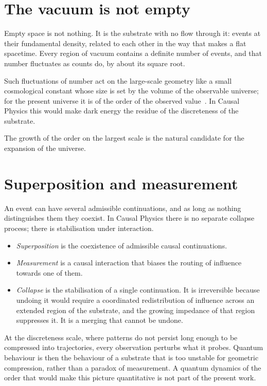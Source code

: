 \section{The vacuum is not empty}\label{sec:onto-vacuum}

Empty space is not nothing. It is the substrate with no flow through it: events at their fundamental
density, related to each other in the way that makes a flat spacetime. Every region of vacuum contains
a definite number of events, and that number fluctuates as counts do, by about its square root.

Such fluctuations of number act on the large-scale geometry like a small cosmological constant whose
size is set by the volume of the observable universe; for the present universe it is of the order of
the observed value~\cite{Ahmed2004}. In Causal Physics this would make dark energy the residue of the
discreteness of the substrate. 

The growth of the order on the largest scale is the natural candidate for the expansion of the
universe. 

\section{Superposition and measurement}\label{sec:onto-superposition}

An event can have several admissible continuations, and as long as nothing distinguishes them they
coexist. In Causal Physics there is no separate collapse process; there is stabilisation under
interaction.
\begin{itemize}
\item \emph{Superposition} is the coexistence of admissible causal continuations.
\item \emph{Measurement} is a causal interaction that biases the routing of influence towards one of
  them.
\item \emph{Collapse} is the stabilisation of a single continuation. It is irreversible because
  undoing it would require a coordinated redistribution of influence across an extended region of the
  substrate, and the growing impedance of that region suppresses it. It is a merging that cannot be
  undone.
\end{itemize}
At the discreteness scale, where patterns do not persist long enough to be compressed into
trajectories, every observation perturbs what it probes. Quantum behaviour is then the behaviour of a
substrate that is too unstable for geometric compression, rather than a paradox of measurement.
\quad A quantum dynamics of the order that would make this picture quantitative
is not part of the present work. 

